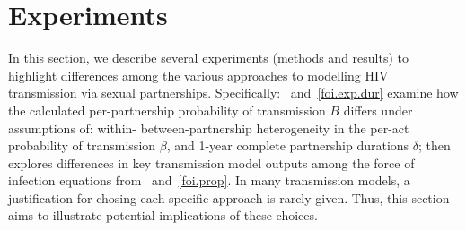 \section{Experiments}\label{foi.exp}
In this section, we describe several experiments (methods and results) to
highlight differences among the various approaches
to modelling HIV transmission via sexual partnerships.
Specifically:
~and~\ref{foi.exp.dur} examine how
the calculated per-partnership probability of transmission $B$ differs under assumptions of:
within- \vs between-partnership heterogeneity in the per-act probability of transmission $\beta$,
and 1-year \vs complete partnership durations $\delta$; then
 explores differences in key transmission model outputs
among the force of infection equations from ~and~\ref{foi.prop}.
In many transmission models,
a justification for chosing each specific approach is rarely given.
Thus, this section aims to illustrate potential implications of these choices.
